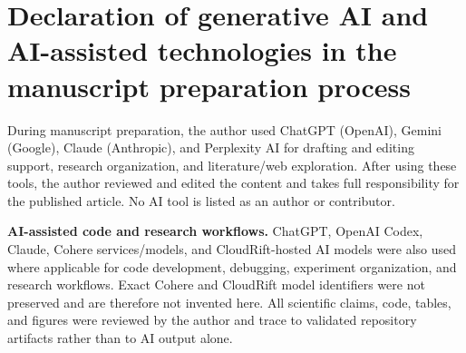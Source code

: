 \section*{Declaration of generative AI and AI-assisted technologies in the manuscript preparation process}

During manuscript preparation, the author used ChatGPT (OpenAI), Gemini
(Google), Claude (Anthropic), and Perplexity AI for drafting and editing
support, research organization, and literature/web exploration. After using
these tools, the author reviewed and edited the content and takes full
responsibility for the published article. No AI tool is listed as an author
or contributor.

\textbf{AI-assisted code and research workflows.} ChatGPT, OpenAI Codex,
Claude, Cohere services/models, and CloudRift-hosted AI models were also
used where applicable for code development, debugging, experiment
organization, and research workflows. Exact Cohere and CloudRift model
identifiers were not preserved and are therefore not invented here. All
scientific claims, code, tables, and figures were reviewed by the author
and trace to validated repository artifacts rather than to AI output alone.
